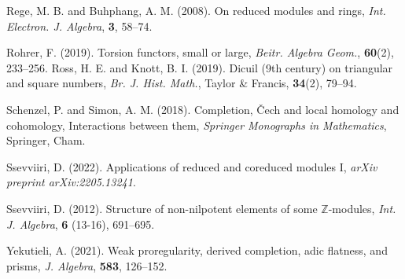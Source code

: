 \documentclass[12pt,a4paper]{article}
\begin{document}
\begin{thebibliography}{99}
			Rege, M. B. and Buhphang, A. M. (2008). On reduced modules and rings, {\it Int. Electron. J. Algebra}, {\bf 3}, 58--74.
			
			 Rohrer, F. (2019). Torsion functors, small or large,
			{\it Beitr. Algebra Geom.}, {\bf 60}(2), 233--256.
			 Ross, H. E. and Knott, B. I. (2019). Dicuil (9th century) on triangular and square numbers,
			{\it Br. J. Hist. Math.}, Taylor \& Francis, {\bf 34}(2), 79--94.
			
			
			
			 Schenzel, P. and Simon, A. M. (2018). Completion, {\v{C}}ech and local homology and cohomology, Interactions between them, {\it Springer Monographs in Mathematics}, Springer, Cham.
			
			 Ssevviiri, D. (2022). Applications of reduced and coreduced modules I, {\it arXiv preprint arXiv:2205.13241}.
			
			 Ssevviiri, D. (2012).
			Structure of non-nilpotent elements of some $\mathbb{Z}$-modules, {\it   Int. J. Algebra}, {\bf 6} (13-16), 691--695.
			
			
			
			 Yekutieli, A. (2021). Weak proregularity, derived completion, adic flatness, and prisms, {\it J. Algebra}, {\bf 583}, 126--152.
			
			
			
			
			
			
			
		\end{thebibliography}
		
	
\end{document}
